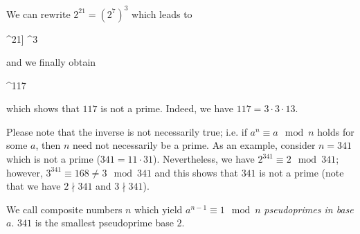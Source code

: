 We can rewrite $2^{21} = (2^7)^3$ which leads to

^{21]} ^3      
\eee

and we finally obtain

^{117}    
\eee

which shows that $117$ is not a prime. Indeed, we have $117 = 3 \cdot 3 \cdot 13$.

Please note that the inverse is not necessarily true; i.e. if $a^{n} \equiv a \mod n$ holds for some $a$, then $n$ need not necessarily be a prime. As an example, consider $n = 341$ which is not a prime ($341 = 11 \cdot 31$). Nevertheless, we have $2^{341} \equiv 2 \mod 341$; however, $3^{341} \equiv 168 \neq 3 \mod 341$ and this shows that $341$ is not a prime (note that we have $2 \nmid 341$ and $3 \nmid 341$).

We call composite numbers $n$ which yield $a^{n-1} \equiv 1 \mod n$ \emph{pseudoprimes in base $a$}. $341$ is the smallest pseudoprime base $2$. 


